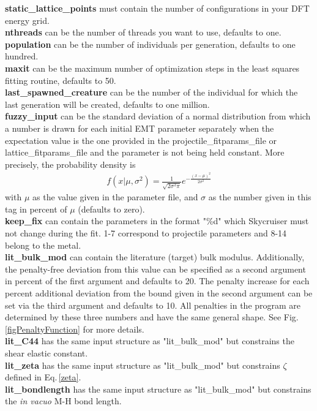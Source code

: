 \documentclass[twoside, 11pt, titlepage, captions=nooneline, a4paper, headsepline]{scrbook}%
\newcommand{\9}{\mathrm}
\newcommand{\0}{\,\mathrm}
\begin{document}
\textbf{static\_lattice\_points} must contain the number of configurations in your DFT energy grid.\\
\textbf{nthreads} can be the number of threads you want to use, defaults to one.\\
\textbf{population} can be the number of individuals per generation, defaults to one hundred.\\
\textbf{maxit} can be the maximum number of optimization steps in the least squares fitting routine, defaults to 50.\\
\textbf{last\_spawned\_creature} can be the number of the individual for which the last generation will be created, defaults to one million.\\
\textbf{fuzzy\_input} can be the standard deviation of a normal distribution from which a number is drawn for each initial EMT parameter separately when the expectation value is the one provided in the projectile\_fitparams\_file or lattice\_fitparams\_file and the parameter is not being held constant. More precisely, the probability density is
\begin{align*}
  f(x|\mu,\sigma^2) = \frac{1}{\sqrt{2\sigma^2\pi}}e^{-\frac{(x-\mu)^2}{2\sigma^2}}
\end{align*}
with $\mu$ as the value given in the parameter file, and $\sigma$ as the number given in this tag in percent of $\mu$ (defaults to zero).\\
\textbf{keep\_fix} can contain the parameters in the format "\%d" which Skycruiser must not change during the fit. 1-7 correspond to projectile parameters and 8-14 belong to the metal.\\ 
\textbf{lit\_bulk\_mod} can contain the literature (target) bulk modulus. Additionally, the penalty-free deviation from this value can be specified as a second argument in percent of the first argument and defaults to 20. The penalty increase for each percent additional deviation from the bound given in the second argument can be set via the third argument and defaults to 10. All penalties in the program are determined by these three numbers and have the same general shape. See Fig.\,\ref{figPenaltyFunction} for more details.\\
\textbf{lit\_C44} has the same input structure as "lit\_bulk\_mod" but constrains the shear elastic constant.\\
\textbf{lit\_zeta} has the same input structure as "lit\_bulk\_mod" but constrains $\zeta$ defined in Eq.\,\ref{zeta}.\\
\textbf{lit\_bondlength} has the same input structure as "lit\_bulk\_mod" but constrains the \textit{in vacuo} M-H bond length.\\
\end{document}
